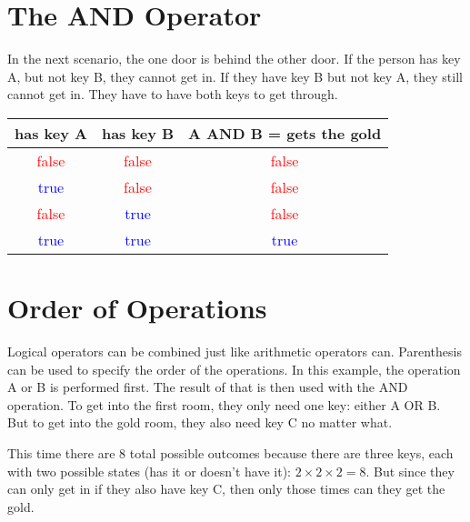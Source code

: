 \section{The AND Operator}

In the next scenario, the one door is behind the other door. If the person has key A, but not key B, they cannot get in. If they have key B but not key A, they still cannot get in. They have to have both keys to get through.\\

\begin{center} \end{center}

\begin{center}
	\begin{tabular}{c | c | c}
		has key A & has key B & A AND B = gets the gold \\ \hline
		\textcolor{red}{false} & \textcolor{red}{false} & \textcolor{red}{false}\\ \hline
		\textcolor{blue}{true} & \textcolor{red}{false} & \textcolor{red}{false} \\ \hline
		\textcolor{red}{false} & \textcolor{blue}{true} & \textcolor{red}{false} \\ \hline
		\textcolor{blue}{true} & \textcolor{blue}{true} & \textcolor{blue}{true} \\ \hline
	\end{tabular}
\end{center}

\section{Order of Operations}

Logical operators can be combined just like arithmetic operators can. Parenthesis can be used to specify the order of the operations. In this example, the operation A or B is performed first. The result of that is then used with the AND operation. To get into the first room, they only need one key: either A OR B. But to get into the gold room, they also need key C no matter what.\\

\begin{center} \end{center}

This time there are 8 total possible outcomes because there are three keys, each with two possible states (has it or doesn't have it): \(2 \times 2 \times 2 = 8 \). But since they can only get in if they also have key C, then only those times can they get the gold.

